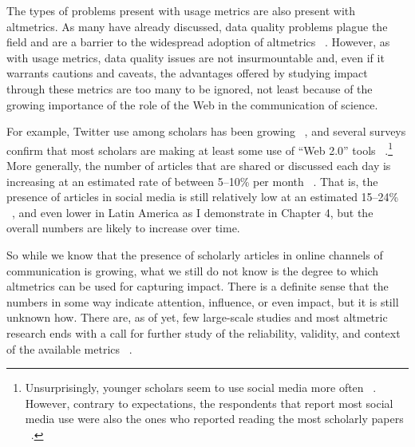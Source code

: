 The types of problems present with usage metrics are also present with altmetrics. As many have already discussed, data quality problems plague the field and are a barrier to the widespread adoption of altmetrics ~\citep{Haustein2013,Wouters2012,Costas2014}. However, as with usage metrics, data quality issues are not insurmountable and, even if it warrants cautions and caveats, the advantages offered by studying impact through these metrics are too many to be ignored, not least because of the growing importance of the role of the Web in the communication of science.

For example, Twitter use among scholars has been growing ~\citep{Priem2012}, and several surveys confirm that most scholars are making at least some use of ``Web 2.0'' tools ~\citep{Procter2010,Tenopir2013}.\footnote{Unsurprisingly, younger scholars seem to use social media more often ~\citep{Tenopir2013}. However, contrary to expectations, the respondents that report most social media use were also the ones who reported reading the most scholarly papers ~\citep{Tenopir2013}.} More generally, the number of articles that are shared or discussed each day is increasing at an estimated rate of between 5--10\% per month ~\citep{Adie2013a}. That is, the presence of articles in social media is still relatively low at an estimated 15--24\% ~\citep{Costas2014}, and even lower in Latin America as I demonstrate in Chapter 4, but the overall numbers are likely to increase over time.

So while we know that the presence of scholarly articles in online channels of communication is growing, what we still do not know is the degree to which altmetrics can be used for capturing impact. There is a definite sense that the numbers in some way indicate attention, influence, or even impact, but it is still unknown how. There are, as of yet, few large-scale studies and most altmetric research ends with a call for further study of the reliability, validity, and context of the available metrics ~\citep{Haustein2013,Wouters2012,Liu2013}.

